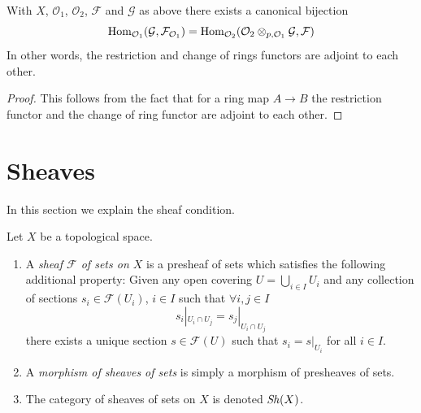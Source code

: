 \begin{lemma}
\label{lemma-adjointness-tensor-restrict-presheaves}
With $X$, $\mathcal{O}_1$, $\mathcal{O}_2$, $\mathcal{F}$ and
$\mathcal{G}$ as above there exists a canonical bijection
$$
\mathop{\mathrm{Hom}}\nolimits_{\mathcal{O}_1}(\mathcal{G}, \mathcal{F}_{\mathcal{O}_1})
=
\mathop{\mathrm{Hom}}\nolimits_{\mathcal{O}_2}(
\mathcal{O}_2 \otimes_{p, \mathcal{O}_1} \mathcal{G},
\mathcal{F}
)
$$
In other words, the restriction and change of rings functors
are adjoint to each other.
\end{lemma}

\begin{proof}
This follows from the fact that for a ring map
$A \to B$ the restriction functor and the change
of ring functor are adjoint to each other.
\end{proof}





\section{Sheaves}
\label{section-sheaves}

\noindent
In this section we explain the sheaf condition.

\begin{definition}
\label{definition-sheaf}
Let $X$ be a topological space.
\begin{enumerate}
\item A {\it sheaf $\mathcal{F}$ of sets on $X$} is a presheaf
of sets which satisfies the following additional property: Given
any open covering $U = \bigcup_{i \in I} U_i$ and any collection
of sections $s_i \in \mathcal{F}(U_i)$, $i \in I$ such that
$\forall i, j\in I$
$$
s_i|_{U_i \cap U_j} = s_j|_{U_i \cap U_j}
$$
there exists a unique section $s \in \mathcal{F}(U)$ such that
$s_i = s|_{U_i}$ for all $i \in I$.
\item A {\it morphism of sheaves of sets} is simply a
morphism of presheaves of sets.
\item The category of sheaves of sets on $X$ is denoted
$\mathop{\mathit{Sh}}\nolimits(X)$.
\end{enumerate}
\end{definition}

